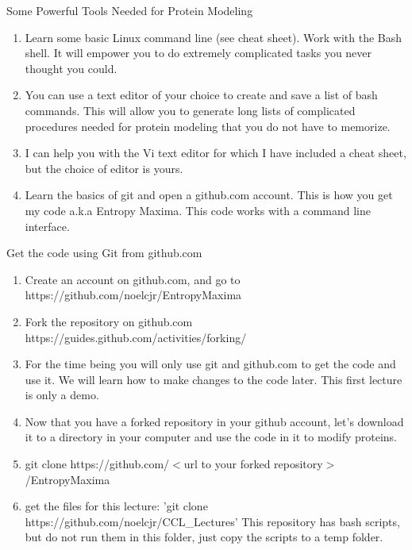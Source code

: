 \documentclass{beamer}
\begin{document}
\begin{frame}[shrink=10]{Some Powerful Tools Needed for Protein Modeling }
       \begin{enumerate}
             \item Learn some basic Linux command line (see cheat sheet). Work with the Bash shell. It will empower you to do extremely 
                   complicated tasks you never thought you could.
             \item You can use a text editor of your choice to create and save a list of bash commands. This will allow you to generate
                   long lists of complicated procedures needed for protein modeling that you do not have to memorize.
             \item I can help you with the Vi text editor for which I have included a cheat sheet, but the choice of editor is yours.
             \item Learn the basics of git and open a github.com account. This is how you get my code a.k.a Entropy Maxima. This code
                   works with a command line interface.
       \end{enumerate}
\end{frame}
\begin{frame}[shrink=15]{Get the code using Git from github.com}
       \begin{enumerate}
             \item Create an account on github.com, and go to https://github.com/noelcjr/EntropyMaxima
             \item Fork the repository on github.com https://guides.github.com/activities/forking/
             \item For the time being you will only use git and github.com to get the code and use it.
                   We will learn how to make changes to the code later. This first lecture is only a demo. 
             \item Now that you have a forked repository in your github account, let's download it to a directory
                   in your computer and use the code in it to modify proteins. 
             \item git clone https://github.com/$<$url to your forked repository$>$/EntropyMaxima
             \item get the files for this lecture: 'git clone https://github.com/noelcjr/CCL\_Lectures'
                   This repository has bash scripts, but do not run them in this folder, just copy the scripts to a temp folder.
       \end{enumerate}
\end{frame}
\end{document}
